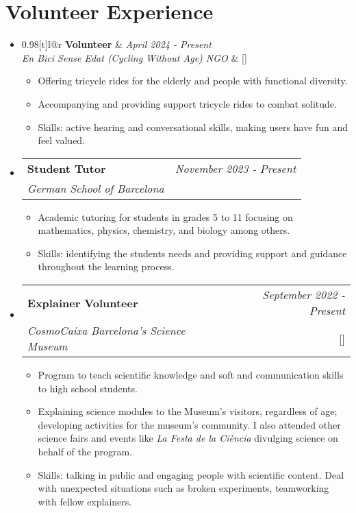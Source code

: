 \documentclass[a4paper,11pt]{article}
\makeatletter
\newcommand{\resumeProject}[4]{
\vspace{0.5mm}\item
    \begin{tabular*}{0.98\textwidth}[t]{l@{\extracolsep{\fill}}r}
        \textbf{#1} & \textit{\footnotesize{#3}} \\
        \footnotesize{\textit{#2}} & \footnotesize{#4}
    \end{tabular*}
    \vspace{-2.4mm}
}
\newcommand{\resumeSubHeadingListStart}{\begin{itemize}[leftmargin=*,labelsep=1mm]}
\newcommand{\resumeItemListStart}{\begin{itemize}[leftmargin=*,labelsep=1mm,itemsep=0.5mm]}
\newcommand{\resumeSubHeadingListEnd}{\end{itemize}\vspace{2mm}}
\newcommand{\resumeItemListEnd}{\end{itemize}\vspace{-2mm}}
\makeatother
\begin{document}
{\section{\textbf{Volunteer Experience}}
\vspace{-0.4mm}
\resumeSubHeadingListStart
\resumeProject
  {Volunteer}
  {En Bici Sense Edat (Cycling Without Age) NGO}
  {April 2024 - Present}
  {{}[\href{https://www.google.com/search?client=safari&rls=en&q=bici+sense+edat+sant+just&ie=UTF-8&oe=UTF-8}{\textcolor{darkblue}{\faIcon{globe}}}]}
\resumeItemListStart
  \item Offering tricycle rides for the elderly and people with functional diversity.
  \item Accompanying and providing support tricycle rides to combat solitude.
  \item Skills: active hearing and conversational skills, making users have fun and feel valued.
\resumeItemListEnd

\resumeProject
    {Student Tutor}
    {German School of Barcelona}
    {November 2023 - Present}
    {{}}
\resumeItemListStart
  \item Academic tutoring for students in grades 5 to 11 focusing on mathematics, physics, chemistry, and biology among others.
  \item Skills: identifying the students needs and providing support and guidance throughout the learning process.
\resumeItemListEnd

\resumeProject
  {Explainer Volunteer}
  {CosmoCaixa Barcelona's Science Museum}
  {September 2022 - Present}
  {{}[\href{https://explainerscosmocaixa.com}{\textcolor{darkblue}{\faIcon{globe}}}]}
\resumeItemListStart
  \item Program to teach scientific knowledge and soft and communication skills to high school students.
  \item Explaining science modules to the Museum's visitors, regardless of age; developing activities for the museum's community. I also attended other science fairs and events like \textit{La Festa de la Ciència} divulging science on behalf of the program.
  \item Skills: talking in public and engaging people with scientific content. Deal with unexpected situations such as broken experiments, teamworking with fellow explainers.
\resumeItemListEnd

\resumeSubHeadingListEnd
\vspace{-6mm}

}
\end{document}
